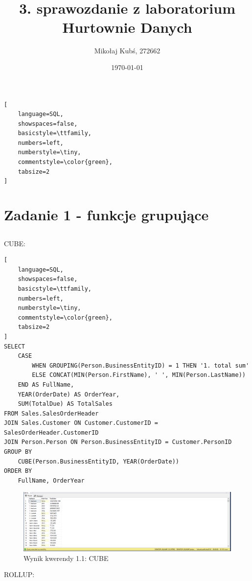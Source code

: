 \documentclass[a4paper,12pt]{article}
\title{3. sprawozdanie z laboratorium Hurtownie Danych}
\author{Mikołaj Kubś, 272662}
\date{\today}
\begin{document}
\maketitle

{\small
\begin{lstlisting}[
	language=SQL,
	showspaces=false,
	basicstyle=\ttfamily,
	numbers=left,
	numberstyle=\tiny,
	commentstyle=\color{green},
	tabsize=2
]
\end{lstlisting}}

\section{Zadanie 1 - funkcje grupujące}

\subsection{}

CUBE:

{\small
\begin{lstlisting}[
	language=SQL,
	showspaces=false,
	basicstyle=\ttfamily,
	numbers=left,
	numberstyle=\tiny,
	commentstyle=\color{green},
	tabsize=2
]
SELECT
    CASE 
        WHEN GROUPING(Person.BusinessEntityID) = 1 THEN '1. total sum'
        ELSE CONCAT(MIN(Person.FirstName), ' ', MIN(Person.LastName))
    END AS FullName,
    YEAR(OrderDate) AS OrderYear,
    SUM(TotalDue) AS TotalSales
FROM Sales.SalesOrderHeader
JOIN Sales.Customer ON Customer.CustomerID = SalesOrderHeader.CustomerID
JOIN Person.Person ON Person.BusinessEntityID = Customer.PersonID
GROUP BY 
    CUBE(Person.BusinessEntityID, YEAR(OrderDate))
ORDER BY 
    FullName, OrderYear
\end{lstlisting}}

\begin{figure}[H]
  \centering
  \includegraphics[width=1.0\textwidth]{images/1.1_cube.png}
  \caption{Wynik kwerendy 1.1: CUBE}
\end{figure}

ROLLUP:
\end{document}
